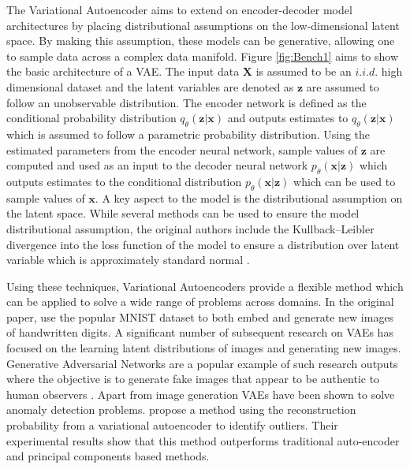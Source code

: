 \documentclass[12pt]{article}
\begin{document}
The Variational Autoencoder aims to extend on encoder-decoder model architectures by placing distributional assumptions on the low-dimensional latent space.  By making this assumption, these models can be generative, allowing one to sample data across a complex data manifold.  Figure \ref{fig:Bench1} aims to show the basic architecture of a VAE. The input data $\mathbf{X}$ is assumed to be an $i.i.d.$ high dimensional dataset and the latent variables are denoted as $\mathbf{z}$ are assumed to follow an unobservable distribution. The encoder network is defined as the conditional probability distribution $q_{\theta}(\mathbf{z}|\mathbf{x})$ and outputs estimates to $q_{\theta}(\mathbf{z}|\mathbf{x})$ which is assumed to follow a parametric probability distribution. Using the estimated parameters from the encoder neural network, sample values of $\mathbf{z}$ are computed and used as an input to the decoder neural network $p_{\theta}(\mathbf{x}|\mathbf{z})$ which outputs estimates to the conditional distribution $p_{\theta}(\mathbf{x}|\mathbf{z})$ which can be used to sample values of $\mathbf{x}$. A key aspect to the model is the distributional assumption on the latent space. While several methods can be used to ensure the model distributional assumption, the original authors include the Kullback–Leibler divergence into the loss function of the model to ensure a distribution over latent variable which is approximately standard normal \citep{vaeBayes, zhao2017infovae, tolstikhin2017wasserstein}.  
\newline

\noindent Using these techniques, Variational Autoencoders provide a flexible method which can be applied to solve a wide range of problems across domains. In the original paper,  \cite{vaeBayes} use the popular MNIST dataset to both embed and generate new images of handwritten digits. A significant number of subsequent research on VAEs has focused on the learning latent distributions of images and generating new images. Generative Adversarial Networks are a popular example of such research outputs where the objective is to generate fake images that appear to be authentic to human observers \citep{Goodfellow2014}.  \newline 
Apart from image generation VAEs have been shown to solve anomaly detection problems. \cite{An2015} propose a method using the reconstruction probability from a variational autoencoder to identify outliers. Their experimental results show that this method outperforms traditional auto-encoder and principal components based methods.\\
\end{document}
